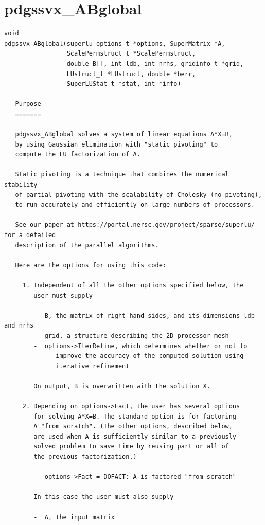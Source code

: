 \section{pdgssvx\_ABglobal}
\begin{verbatim}
void
pdgssvx_ABglobal(superlu_options_t *options, SuperMatrix *A, 
                 ScalePermstruct_t *ScalePermstruct,
                 double B[], int ldb, int nrhs, gridinfo_t *grid,
                 LUstruct_t *LUstruct, double *berr,
                 SuperLUStat_t *stat, int *info)

   Purpose
   =======
  
   pdgssvx_ABglobal solves a system of linear equations A*X=B,
   by using Gaussian elimination with "static pivoting" to
   compute the LU factorization of A.
  
   Static pivoting is a technique that combines the numerical stability
   of partial pivoting with the scalability of Cholesky (no pivoting),
   to run accurately and efficiently on large numbers of processors.
  
   See our paper at https://portal.nersc.gov/project/sparse/superlu/ for a detailed
   description of the parallel algorithms.
  
   Here are the options for using this code:
  
     1. Independent of all the other options specified below, the
        user must supply
  
        -  B, the matrix of right hand sides, and its dimensions ldb and nrhs
        -  grid, a structure describing the 2D processor mesh
        -  options->IterRefine, which determines whether or not to
              improve the accuracy of the computed solution using 
              iterative refinement
  
        On output, B is overwritten with the solution X.
  
     2. Depending on options->Fact, the user has several options
        for solving A*X=B. The standard option is for factoring
        A "from scratch". (The other options, described below,
        are used when A is sufficiently similar to a previously 
        solved problem to save time by reusing part or all of 
        the previous factorization.)
  
        -  options->Fact = DOFACT: A is factored "from scratch"
  
        In this case the user must also supply
  
        -  A, the input matrix
  

\end{verbatim}
